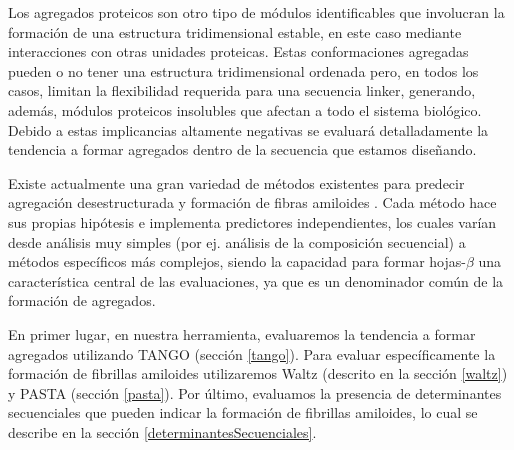 Los agregados proteicos son otro tipo de módulos identificables que involucran la formación de una estructura tridimensional estable, en este caso mediante interacciones con otras unidades proteicas.
Estas conformaciones agregadas pueden o no tener una estructura tridimensional ordenada pero, en todos los casos, limitan la flexibilidad requerida para una secuencia linker, generando, además,
módulos proteicos insolubles que afectan a todo el sistema biológico.
Debido a estas implicancias altamente negativas se evaluará detalladamente la tendencia a formar agregados dentro de la secuencia que estamos diseñando.
 

Existe actualmente una gran variedad de métodos existentes para predecir agregación desestructurada y formación de fibras amiloides \cite{hamodrakas2011protein,redler2014computational,agrawal2011aggregation}.
Cada método hace sus propias hipótesis e implementa predictores independientes, los cuales varían desde análisis muy simples (por ej. análisis de la composición secuencial) a métodos específicos más complejos, siendo 
la capacidad para formar hojas-$\beta$ una característica central de las evaluaciones, ya que es un denominador común de la formación de agregados.

En primer lugar, en nuestra herramienta, evaluaremos la tendencia a formar agregados utilizando TANGO (sección \ref{tango}). 
Para evaluar específicamente la formación de fibrillas amiloides utilizaremos Waltz (descrito en la sección \ref{waltz}) y PASTA (sección \ref{pasta}).
Por último, evaluamos la presencia de determinantes secuenciales que pueden indicar la formación de fibrillas amiloides, lo cual se describe en la sección \ref{determinantesSecuenciales}.



















